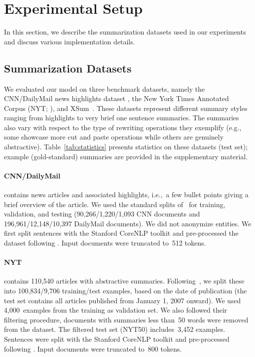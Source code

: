\documentclass[11pt,a4paper]{article}
\begin{document}
    
    
    \section{Experimental Setup}
    In this section, we describe the summarization datasets used in our
    experiments and discuss various implementation details.
    


    
    
    
    
    
    \subsection{Summarization Datasets}
    We evaluated our model on three benchmark datasets, namely the
    CNN/DailyMail news highlights dataset \cite{hermann2015teaching},
    the New York Times Annotated Corpus (NYT; \citealt{nytcorpus}),
    and XSum~\cite{xsum}. These datasets represent different summary
    styles ranging from highlights to very brief one sentence
    summaries. The summaries also vary with respect to the type of
    rewriting operations they exemplify (e.g., some showcase more cut
    and paste operations while others are genuinely
    abstractive). Table~\ref{tab:statistics} presents statistics on
    these datasets (test set); example (gold-standard) summaries are
    provided in the supplementary material.
    
    
    \paragraph{CNN/DailyMail} contains news articles and associated
    highlights, i.e.,~a few bullet points giving a brief overview of
    the article.  We used the standard splits
    of~\citet{hermann2015teaching} for training, validation, and
    testing (90,266/1,220/1,093 CNN documents and
    196,961/12,148/10,397 DailyMail documents). We did not anonymize
    entities.  We first split sentences with the Stanford CoreNLP
    toolkit \cite{manning-etal-2014-stanford} and pre-processed the
    dataset following \citet{see-acl17}.  Input documents were
    truncated to~512 tokens.
    
    
    \vspace{-1ex}
    \paragraph{NYT} contains 110,540 articles with abstractive
    summaries. Following~\citet{durrett2016learning}, we split these
    into 100,834/9,706 training/test examples, based on the date of
    publication (the test set contains all articles published from
    January 1, 2007 onward).  We used 4,000~examples from the training
    as validation set.  We also followed their filtering procedure,
    documents with summaries less than~50 words were removed from the
    dataset.  The filtered test set (NYT50) includes~3,452 examples.
    Sentences were split with the Stanford CoreNLP toolkit
    \cite{manning-etal-2014-stanford} and pre-processed following
    \citet{durrett2016learning}.  Input documents were truncated
    to~800 tokens.
    
\end{document}
